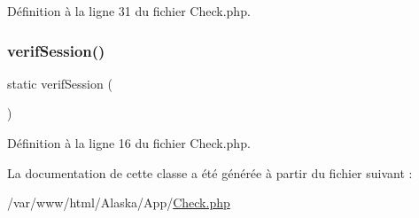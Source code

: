 Définition à la ligne 31 du fichier Check.\+php.

\mbox{\label{class_app_1_1_check_a762802022c6341f5a11a5bd2d24e374a}} 
\subsubsection{\texorpdfstring{verif\+Session()}{verifSession()}}
{\footnotesize\ttfamily static verif\+Session (\begin{DoxyParamCaption}{ }\end{DoxyParamCaption})\hspace{0.3cm}{\ttfamily [static]}}



Définition à la ligne 16 du fichier Check.\+php.



La documentation de cette classe a été générée à partir du fichier suivant \+:\begin{DoxyCompactItemize}
\item 
/var/www/html/\+Alaska/\+App/\hyperlink{_check_8php}{Check.\+php}\end{DoxyCompactItemize}
